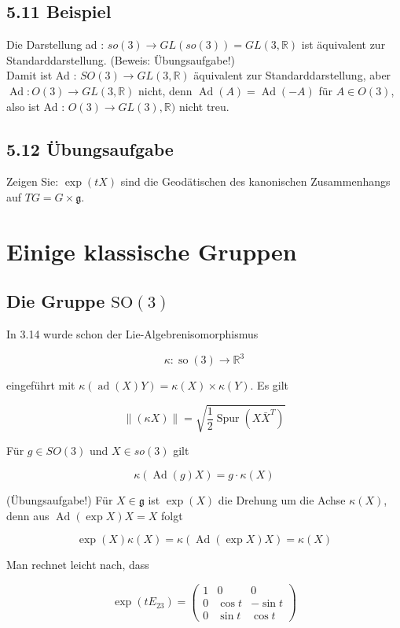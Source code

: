 \documentclass[10pt, letterpaper]{article}
\begin{document}
\subsection*{5.11 Beispiel}
Die Darstellung ad : $s o(3) \rightarrow G L(s o(3))=G L(3, \mathbb{R})$ ist äquivalent zur Standarddarstellung. (Beweis: Übungsaufgabe!)\\
Damit ist Ad : $S O(3) \rightarrow G L(3, \mathbb{R})$ äquivalent zur Standarddarstellung, aber $\operatorname{Ad}: O(3) \rightarrow G L(3, \mathbb{R})$ nicht, denn $\operatorname{Ad}(A)=\operatorname{Ad}(-A)$ für $A \in O(3)$, also ist Ad : $O(3) \rightarrow G L(3), \mathbb{R})$ nicht treu.

\subsection*{5.12 Übungsaufgabe}
Zeigen Sie: $\exp (t X)$ sind die Geodätischen des kanonischen Zusammenhangs auf $T G=G \times \mathfrak{g}$.



\section{Einige klassische Gruppen}

\subsection{Die Gruppe $\mathrm{SO}(3)$}
In 3.14 wurde schon der Lie-Algebrenisomorphismus

$$
\kappa: \operatorname{so}(3) \rightarrow \mathbb{R}^{3}
$$

eingeführt mit $\kappa(\operatorname{ad}(X) Y)=\kappa(X) \times \kappa(Y)$. Es gilt

$$
\|(\kappa X)\|=\sqrt{\frac{1}{2} \operatorname{Spur}\left(X \bar{X}^{T}\right)}
$$

Für $g \in S O(3)$ und $X \in s o(3)$ gilt

$$
\kappa(\operatorname{Ad}(g) X)=g \cdot \kappa(X)
$$

(Übungsaufgabe!) Für $X \in \mathfrak{g}$ ist $\exp (X)$ die Drehung um die Achse $\kappa(X)$, denn aus $\operatorname{Ad}(\exp X) X=X$ folgt

$$
\exp (X) \kappa(X)=\kappa(\operatorname{Ad}(\exp X) X)=\kappa(X)
$$

Man rechnet leicht nach, dass

$$
\exp \left(t E_{23}\right)=\left(\begin{array}{ccc}
1 & 0 & 0 \\
0 & \cos t & -\sin t \\
0 & \sin t & \cos t
\end{array}\right)
$$
\end{document}
